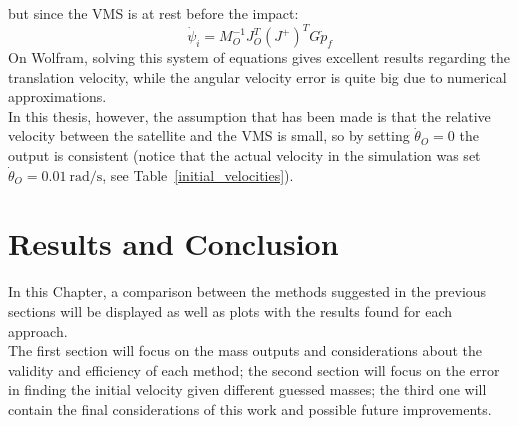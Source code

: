 \documentclass[a4paper,12pt,oneside]{report}
\begin{document}
but since the VMS is at rest before the impact:
\begin{equation}
  \dot{\psi}_i=M_O^{-1}J_O^T(J^+)^TG\dot{p}_f
\end{equation}
On Wolfram, solving this system of equations gives excellent results regarding the translation velocity, while the angular velocity error is quite big due to numerical approximations.\\
In this thesis, however, the assumption that has been made is that the relative velocity between the satellite and the VMS is small, so by setting $\dot{\theta}_O=0$ the output is consistent (notice that the actual velocity in the simulation was set $\dot{\theta}_O=\SI{0.01}{\radian\per\second}$, see Table~\ref{initial_velocities}).
\chapter{Results and Conclusion}
In this Chapter, a comparison between the methods suggested in the previous sections will be displayed as well as plots with the results found for each approach.\\
The first section will focus on the mass outputs and considerations about the validity and efficiency of each method; the second section will focus on the error in finding the initial velocity given different guessed masses; the third one will contain the final considerations of this work and possible future improvements.
\newpage
\end{document}
